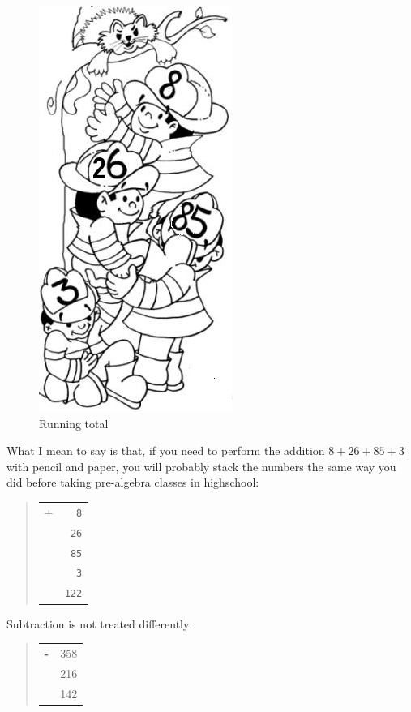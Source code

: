 \documentclass[a4paper,12pt]{book}
\begin{document}
\begin{figure}
\renewcommand\figurename{Fig.}
\includegraphics[scale=0.5]{figs-prefix/firemen.png}
\caption{Running total}
\end{figure}
What I mean to say is that, if you
need to perform the addition
$8 + 26 + 85 + 3$ with pencil and paper,
you will probably stack the numbers the
same way you did before taking pre-algebra
classes in highschool:
\begin{quote}
\begin{tabular}{p{0.5cm}p{1cm}}
+ &\verb|  8|\\
&\verb| 26|\\
&\verb| 85|\\
&\verb|  3|\\
\hline
&\verb|122|
\end{tabular}
\end{quote}
Subtraction is not treated differently:
\begin{quote}
\begin{tabular}{p{0.5cm}p{1.5cm}}
\Large\bf -&   358\\
&   216\\
\hline
& 142
\end{tabular}
\end{quote}
\end{document}
